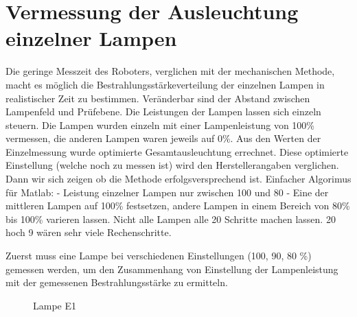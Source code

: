 \documentclass[a4paper,bibtotoc,oneside]{scrbook}
\begin{document}
\section{Vermessung der Ausleuchtung einzelner Lampen}

Die geringe Messzeit des Roboters, verglichen mit der mechanischen Methode, macht es möglich die Bestrahlungsstärkeverteilung der einzelnen Lampen in realistischer Zeit zu bestimmen.
Veränderbar sind der Abstand zwischen Lampenfeld und Prüfebene. Die Leistungen der Lampen lassen sich einzeln steuern. 
Die Lampen wurden einzeln mit einer Lampenleistung von 100\% vermessen, die anderen Lampen waren jeweils auf 0\%. Aus den Werten der Einzelmessung wurde optimierte Gesamtausleuchtung errechnet. Diese optimierte Einstellung (welche noch zu messen ist) wird den Herstellerangaben verglichen. Dann wir sich zeigen ob die Methode erfolgsversprechend ist.
Einfacher Algorimus für Matlab:
- Leistung einzelner Lampen nur zwischen 100 und 80%
- Eine der mittleren Lampen auf 100\% festsetzen, andere Lampen in einem Bereich von 80\% bis 100\% varieren lassen. Nicht alle Lampen alle 20 Schritte machen lassen. 20 hoch 9 wären sehr viele Rechenschritte.

Zuerst muss eine Lampe bei verschiedenen Einstellungen (100, 90, 80 \%) gemessen werden, um den Zusammenhang von Einstellung der Lampenleistung mit der gemessenen Bestrahlungsstärke zu ermitteln.

\begin{figure}
\caption{Lampe E1}
\end{figure} 
\end{document}
